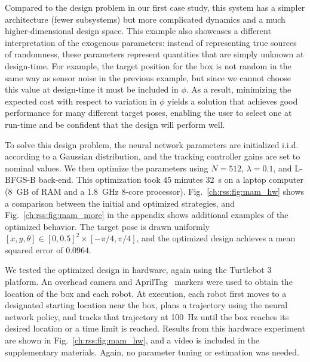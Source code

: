 
Compared to the design problem in our first case study, this system has a simpler architecture (fewer subsystems) but more complicated dynamics and a much higher-dimensional design space. This example also showcases a different interpretation of the exogenous parameters: instead of representing true sources of randomness, these parameters represent quantities that are simply unknown at design-time. For example, the target position for the box is not random in the same way as sensor noise in the previous example, but since we cannot choose this value at design-time it must be included in $\phi$. As a result, minimizing the expected cost with respect to variation in $\phi$ yields a solution that achieves good performance for many different target poses, enabling the user to select one at run-time and be confident that the design will perform well.

To solve this design problem, the neural network parameters are initialized i.i.d. according to a Gaussian distribution, and the tracking controller gains are set to nominal values. We then optimize the parameters using $N = 512$, $\lambda = 0.1$, and L-BFGS-B back-end. This optimization took 45 minutes \SI{32}{s} on a laptop computer (\SI{8}{GB} of RAM and a \SI{1.8}{GHz} 8-core processor). Fig.~\ref{ch:rss:fig:mam_hw} shows a comparison between the initial and optimized strategies, and Fig.~\ref{ch:rss:fig:mam_more} in the appendix shows additional examples of the optimized behavior. The target pose is drawn uniformly $[x, y, \theta] \in[0, 0.5]^2 \times [-\pi/4, \pi/4]$, and the optimized design achieves a mean squared error of $0.0964$.

We tested the optimized design in hardware, again using the Turtlebot 3 platform. An overhead camera and AprilTag~\cite{olson2011tags} markers were used to obtain the location of the box and each robot. At execution, each robot first moves to a designated starting location near the box, plans a trajectory using the neural network policy, and tracks that trajectory at \SI{100}{Hz} until the box reaches its desired location or a time limit is reached. Results from this hardware experiment are shown in Fig.~\ref{ch:rss:fig:mam_hw}, and a video is included in the supplementary materials. Again, no parameter tuning or estimation was needed.

